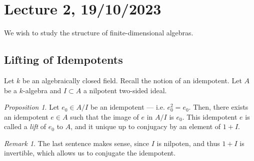 \documentclass[a4paper]{report}
\theoremstyle{definition}
\theoremstyle{remark}
\newtheorem{remark}{Remark}
\theoremstyle{proposition}
\newtheorem{proposition}{Proposition}
\theoremstyle{conjecture}
\theoremstyle{lemma}
\theoremstyle{corollary}
\theoremstyle{exercise}
\theoremstyle{example}
\begin{document}
\section{Lecture 2, 19/10/2023}

We wish to study the structure of finite-dimensional algebras.

\subsection{Lifting of Idempotents}

Let $k$ be an algebraically closed field. Recall the notion of an idempotent.
Let $A$ be a $k$-algebra and $I \subset A$ a nilpotent two-sided ideal.

\begin{proposition}\label{prop28}
    Let $e_0 \in A/I$ be an idempotent --- i.e. $e_0^2 = e_0$.
    Then, there exists an idempotent $e\in A$ such that the image of 
    $e$ in $A/I$ is $e_0$. This idempotent $e$ is called a \emph{lift} of $e_0$
    to $A$, and it unique up to conjugacy by an element of $1 + I$.
\end{proposition}

\begin{remark}
    The last sentence makes sense, since $I$ is nilpoten, and thus 
    $1+I$ is invertible, which allows us to conjugate the idempotent.
\end{remark}
\end{document}
